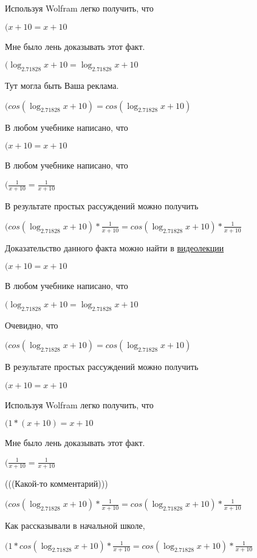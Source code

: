 \documentclass[12pt,a4paper,fleqn]{article}
\theoremstyle{definition}
\begin{document}
Используя Wolfram легко получить, что

$( x  +  10  =  x  +  10 $

Мне было лень доказывать этот факт.

$(\log_{ 2.71828 }{ x  +  10 } = \log_{ 2.71828 }{ x  +  10 }$

Тут могла быть Ваша реклама.

$(cos(\log_{ 2.71828 }{ x  +  10 }) = cos(\log_{ 2.71828 }{ x  +  10 })$

В любом учебнике написано, что

$( x  +  10  =  x  +  10 $

В любом учебнике написано, что

$(\frac{ 1 }{ x  +  10 }
 = \frac{ 1 }{ x  +  10 }
$

В результате простых рассуждений можно получить

$(cos(\log_{ 2.71828 }{ x  +  10 }) * \frac{ 1 }{ x  +  10 }
 = cos(\log_{ 2.71828 }{ x  +  10 }) * \frac{ 1 }{ x  +  10 }
$

Доказательство данного факта можно найти в \href{https://www.youtube.com/watch?v=dQw4w9WgXcQ}{видеолекции}

$( x  +  10  =  x  +  10 $

В любом учебнике написано, что

$(\log_{ 2.71828 }{ x  +  10 } = \log_{ 2.71828 }{ x  +  10 }$

Очевидно, что

$(cos(\log_{ 2.71828 }{ x  +  10 }) = cos(\log_{ 2.71828 }{ x  +  10 })$

В результате простых рассуждений можно получить

$( x  +  10  =  x  +  10 $

Используя Wolfram легко получить, что

$( 1  * ( x  +  10 ) =  x  +  10 $

Мне было лень доказывать этот факт.

$(\frac{ 1 }{ x  +  10 }
 = \frac{ 1 }{ x  +  10 }
$

(((Какой-то комментарий)))

$(cos(\log_{ 2.71828 }{ x  +  10 }) * \frac{ 1 }{ x  +  10 }
 = cos(\log_{ 2.71828 }{ x  +  10 }) * \frac{ 1 }{ x  +  10 }
$

Как рассказывали в начальной школе,

$( 1  * cos(\log_{ 2.71828 }{ x  +  10 }) * \frac{ 1 }{ x  +  10 }
 = cos(\log_{ 2.71828 }{ x  +  10 }) * \frac{ 1 }{ x  +  10 }
$
\end{document}
